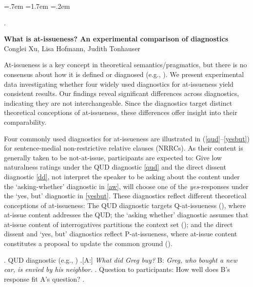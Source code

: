 \documentclass[11pt, a4paper]{article}
\newif\ifparens\parensfalse
\newcommand\pref[1]{{\parenstrue\ref{#1}}}
\begin{document}
  \Exlabelsep=.7em
  \SubExleftmargin=1.7em
  \Extopsep=.2em

\phantom.\vspace{-3.5\baselineskip}
\begin{center}
  {\large \bf What is at-issueness? An experimental comparison of diagnostics}\\
  \normalsize Conglei Xu, Lisa Hofmann, Judith Tonhauser
  
\end{center}

\vspace{-.5\baselineskip}
\normalsize
  \noindent At-issueness is a key concept in theoretical semantics/pragmatics, but there is no consensus about how it is defined or diagnosed (e.g., \citealt{tonhauser_diagnosing_2012,tonhauser_how_2018,koev_notions_2018}). We present experimental data investigating whether four widely used diagnostics for at-issueness yield consistent results. Our findings reveal significant differences across diagnostics, indicating they are not interchangeable. Since the diagnostics target distinct theoretical conceptions of at-issueness, these differences offer insight into their comparability.
  \vspace{.1\baselineskip}

  Four commonly used diagnostics for at\hyp issueness are illustrated in (\pref{qud}--\pref{yesbut}) for sentence-medial non-restrictive relative clauses (NRRCs). As their content is generally taken to be not-at-issue, participants are expected to:
  Give low naturalness ratings under the QUD diagnostic \ref{qud} and the direct dissent diagnostic \ref{dd}, not interpret the speaker to be asking about the content under the `asking-whether' diagnostic in \ref{aw}, will choose one of the %
  \emph{yes}-responses under the `yes, but' diagnostic in \ref{yesbut}.
  These diagnostics reflect different theoretical conceptions of at-issueness: The QUD diagnostic targets Q-at-issueness (\citealt{koev_notions_2018}), where at-issue content addresses the QUD; the `asking whether' diagnostic assumes that at-issue content of interrogatives partitions the context set (\citealt{tonhauser_how_2018}); and the direct dissent and `yes, but' diagnostics reflect P-at-issueness, where at-issue content constitutes a proposal to update the common ground (\citealt{koev_notions_2018}).


  \ex. \label{qud}%
    QUD diagnostic (e.g., \citealt{tonhauser_diagnosing_2012,chen_presuppositions_2024})
    \a.[A:] \emph{What did Greg buy?} \hfill 
      B: \hspace{.5em} \emph{Greg, who bought a new car, is envied by his neighbor.}
    \z.
    Question to participants: How well does B's response fit A's question?
  \z.
\end{document}

